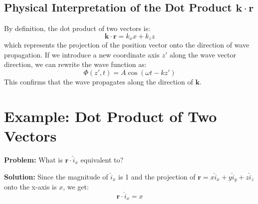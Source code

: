 \documentclass{article}
\begin{document}
\subsection{Physical Interpretation of the Dot Product $\mathbf{k} \cdot \mathbf{r}$}
By definition, the dot product of two vectors is:
\begin{equation}
    \mathbf{k} \cdot \mathbf{r} = k_x x + k_z z
\end{equation}
which represents the projection of the position vector onto the direction of wave propagation. If we introduce a new coordinate axis $z'$ along the wave vector direction, we can rewrite the wave function as:
\begin{equation}
    \Phi(z',t) = A \cos(\omega t - k z')
\end{equation}
This confirms that the wave propagates along the direction of $\mathbf{k}$.

\section{Example: Dot Product of Two Vectors}
\textbf{Problem:} What is $\mathbf{r} \cdot \hat{i}_x$ equivalent to?

\textbf{Solution:} Since the magnitude of $\hat{i}_x$ is 1 and the projection of $\mathbf{r} = x \hat{i}_x + y \hat{i}_y + z \hat{i}_z$ onto the x-axis is $x$, we get:
\begin{equation}
    \mathbf{r} \cdot \hat{i}_x = x
\end{equation}
\end{document}
